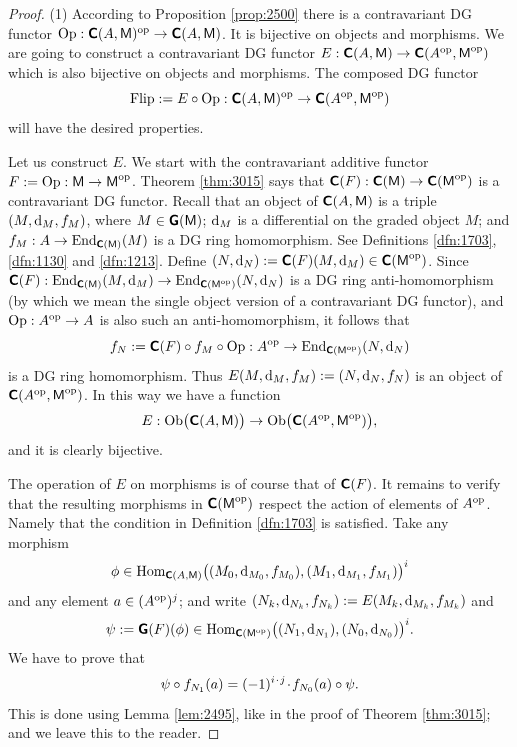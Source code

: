 \begin{proof} \mbox{}

\smallskip \noindent 
(1) According to Proposition \ref{prop:2500} there is a contravariant DG 
functor 
$\opn{Op} : \lb \dcat{C}(A, \cat{M})^{\mrm{op}} \to \dcat{C}(A, \cat{M})$.
It is bijective on objects and morphisms. We are going to construct a
contravariant DG functor
$E : \boldsymbol{\mathsf{C}}(A, \operatorname{\mathsf{M}}) \to \boldsymbol{\mathsf{C}}(A^{\mathrm{op}}, \operatorname{\mathsf{M}}^{\mathrm{op}})$
which is also bijective on objects and morphisms. The composed DG functor 
\[ \operatorname{Flip} := E \circ \operatorname{Op} : \boldsymbol{\mathsf{C}}(A, \operatorname{\mathsf{M}})^{\mathrm{op}} \to 
\boldsymbol{\mathsf{C}}(A^{\mathrm{op}}, \operatorname{\mathsf{M}}^{\mathrm{op}}) \]
will have the desired properties. 

Let us construct $E$. We start with the contravariant additive functor 
$F := \operatorname{Op} : \operatorname{\mathsf{M}} \to \operatorname{\mathsf{M}}^{\mathrm{op}}$.
Theorem \ref{thm:3015}   says that 
$\boldsymbol{\mathsf{C}}(F) : \boldsymbol{\mathsf{C}}(\operatorname{\mathsf{M}}) \to \boldsymbol{\mathsf{C}}(\operatorname{\mathsf{M}}^{\mathrm{op}})$
is a contravariant DG functor. 
Recall that an object of $\boldsymbol{\mathsf{C}}(A, \operatorname{\mathsf{M}})$ is a triple 
$(M, \mathrm{d}_M, f_M)$, where $M \in \boldsymbol{\mathsf{G}}(\operatorname{\mathsf{M}})$; $\mathrm{d}_M$ is a differential on 
the graded object $M$; and 
$f_M : A \to \operatorname{End}_{\boldsymbol{\mathsf{C}}(\operatorname{\mathsf{M}})}(M)$
is a DG ring homomorphism. See Definitions \ref{dfn:1703}, \ref{dfn:1130} and 
\ref{dfn:1213}.
Define 
$(N, \mathrm{d}_N) := \boldsymbol{\mathsf{C}}(F)(M, \mathrm{d}_M) \in \boldsymbol{\mathsf{C}}(\operatorname{\mathsf{M}}^{\mathrm{op}})$.
Since 
$\boldsymbol{\mathsf{C}}(F) : \operatorname{End}_{\boldsymbol{\mathsf{C}}(\operatorname{\mathsf{M}})}(M, \mathrm{d}_M) \to 
\operatorname{End}_{\boldsymbol{\mathsf{C}}(\operatorname{\mathsf{M}}^{\mathrm{op}})}(N, \mathrm{d}_N)$
is a DG ring anti-homomorphism (by which we mean the single object version of a 
contravariant DG functor), and 
$\operatorname{Op} : A^{\mathrm{op}} \to A$ 
is also such an anti-homomorphism, it follows that 
\[ f_N := \boldsymbol{\mathsf{C}}(F) \circ f_M \circ \operatorname{Op} : A^{\mathrm{op}} \to 
\operatorname{End}_{\boldsymbol{\mathsf{C}}(\operatorname{\mathsf{M}}^{\mathrm{op}})}(N, \mathrm{d}_N) \]
is a DG ring homomorphism. Thus 
$E(M, \mathrm{d}_M, f_M) := (N, \mathrm{d}_N, f_N)$ 
is an object of $\boldsymbol{\mathsf{C}}(A^{\mathrm{op}}, \operatorname{\mathsf{M}}^{\mathrm{op}})$.
In this way we have a function 
\[ E : \operatorname{Ob} \bigl( \boldsymbol{\mathsf{C}}(A, \operatorname{\mathsf{M}}) \bigr) \to 
\operatorname{Ob} \bigl( \boldsymbol{\mathsf{C}}(A^{\mathrm{op}}, \operatorname{\mathsf{M}}^{\mathrm{op}}) \bigr) , \]
and it is clearly bijective.  

The operation of $E$ on morphisms is of course that of $\boldsymbol{\mathsf{C}}(F)$. 
It remains to verify that the resulting morphisms in 
$\boldsymbol{\mathsf{C}}(\operatorname{\mathsf{M}}^{\mathrm{op}})$ respect the action of 
elements of $A^{\mathrm{op}}$. Namely that the condition in Definition 
\ref{dfn:1703} is satisfied. Take any morphism 
\[ \phi \in \operatorname{Hom}_{\boldsymbol{\mathsf{C}}(A, \operatorname{\mathsf{M}})} 
\bigl( (M_0, \mathrm{d}_{M_0}, f_{M_0}), (M_1, \mathrm{d}_{M_1}, f_{M_1}) \bigr)^i \]
and any element $a \in (A^{\mathrm{op}})^j$; and write 
$(N_k, \mathrm{d}_{N_k}, f_{N_k}) := E(M_k, \mathrm{d}_{M_k}, f_{M_k})$
and
\[ \psi := \boldsymbol{\mathsf{G}}(F)(\phi) \in 
\operatorname{Hom}_{\boldsymbol{\mathsf{C}}(\operatorname{\mathsf{M}}^{\mathrm{op}})} 
\bigl( (N_1, \mathrm{d}_{N_1}), (N_0, \mathrm{d}_{N_0}) \bigr)^i . \]
We have to prove that 
\begin{equation} \label{eqn:2366}
\psi \circ f_{N_1}(a) = (-1)^{i \mspace{1.5mu}{\cdot}\mspace{1.5mu} j} \mspace{1.5mu}{\cdot}\mspace{1.5mu} f_{N_0}(a) \circ \psi . 
\end{equation}
This is done using Lemma \ref{lem:2495}, like in the proof of 
Theorem \ref{thm:3015}; and we leave this to the reader.


\end{proof}
